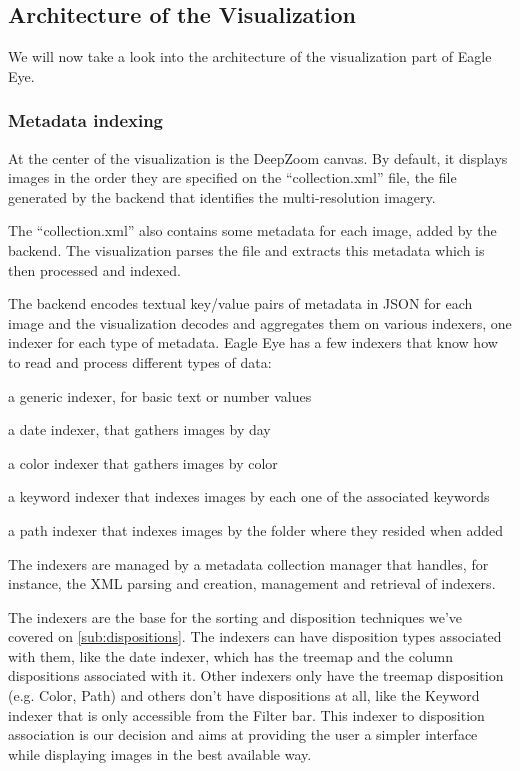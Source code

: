 \subsection{Architecture of the Visualization}

We will now take a look into the architecture of the visualization part of Eagle Eye.


\subsubsection{Metadata indexing}

At the center of the visualization is the DeepZoom canvas. By default, it displays images in the order they are specified on the ``collection.xml'' file, the file generated by the backend that identifies the multi-resolution imagery.

The ``collection.xml'' also contains some metadata for each image, added by the backend. The visualization parses the file and extracts this metadata which is then processed and indexed.

The backend encodes textual key/value pairs of metadata in JSON for each image and the visualization decodes and aggregates them on various indexers, one indexer for each type of metadata. Eagle Eye has a few indexers that know how to read and process different types of data:
\begin{myitemize}
	\item{a generic indexer, for basic text or number values}
	\item{a date indexer, that gathers images by day}
	\item{a color indexer that gathers images by color}
	\item{a keyword indexer that indexes images by each one of the associated keywords}
	\item{a path indexer that indexes images by the folder where they resided when added}
\end{myitemize}

The indexers are managed by a metadata collection manager that handles, for instance, the XML parsing and creation, management and retrieval of indexers.

The indexers are the base for the sorting and disposition techniques we've covered on \ref{sub:dispositions}. The indexers can have disposition types associated with them, like the date indexer, which has the treemap and the column dispositions associated with it. Other indexers only have the treemap disposition (e.g. Color, Path) and others don't have dispositions at all, like the Keyword indexer that is only accessible from the Filter bar. This indexer to disposition association is our decision and aims at providing the user a simpler interface while displaying images in the best available way.

